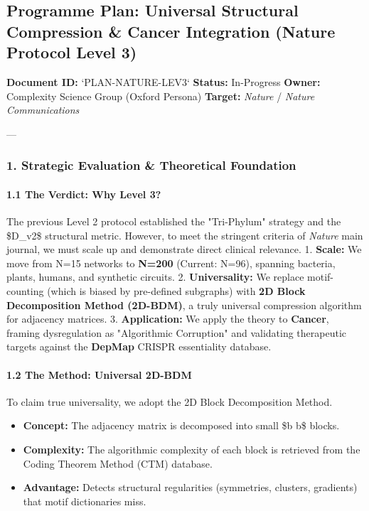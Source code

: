 \documentclass{article}
\begin{document}
\subsection{Programme Plan: Universal Structural Compression \& Cancer Integration (Nature Protocol Level 3)}
\textbf{Document ID:} `PLAN-NATURE-LEV3`
\textbf{Status:} In-Progress
\textbf{Owner:} Complexity Science Group (Oxford Persona)
\textbf{Target:} \textit{Nature} / \textit{Nature Communications}

---

\subsubsection{1. Strategic Evaluation \& Theoretical Foundation}

\paragraph{1.1 The Verdict: Why Level 3?}
The previous Level 2 protocol established the "Tri-Phylum" strategy and the \$D\_{v2}\$ structural metric. However, to meet the stringent criteria of \textit{Nature} main journal, we must scale up and demonstrate direct clinical relevance.
1.  \textbf{Scale:} We move from N=15 networks to \textbf{N=200} (Current: N=96), spanning bacteria, plants, humans, and synthetic circuits.
2.  \textbf{Universality:} We replace motif-counting (which is biased by pre-defined subgraphs) with \textbf{2D Block Decomposition Method (2D-BDM)}, a truly universal compression algorithm for adjacency matrices.
3.  \textbf{Application:} We apply the theory to \textbf{Cancer}, framing dysregulation as "Algorithmic Corruption" and validating therapeutic targets against the \textbf{DepMap} CRISPR essentiality database.

\paragraph{1.2 The Method: Universal 2D-BDM}
To claim true universality, we adopt the 2D Block Decomposition Method.
\begin{itemize}
\item   \textbf{Concept:} The adjacency matrix is decomposed into small \$b \times b\$ blocks.
\item   \textbf{Complexity:} The algorithmic complexity of each block is retrieved from the Coding Theorem Method (CTM) database.
\item   \textbf{Advantage:} Detects structural regularities (symmetries, clusters, gradients) that motif dictionaries miss.
\end{itemize}
\end{document}
